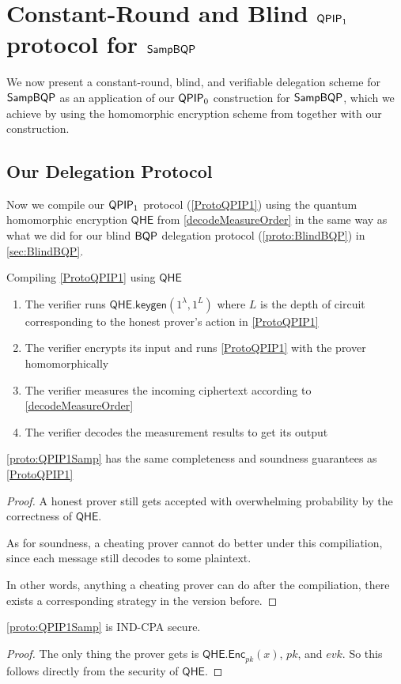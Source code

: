 \section{Constant-Round and Blind $\operatorname{\mathsf{QPIP}}_1$ protocol for $\operatorname{\mathsf{SampBQP}}$}

We now present a constant-round, blind, and verifiable delegation scheme for $\operatorname{\mathsf{SampBQP}}$ as an application of our $\operatorname{\mathsf{QPIP}}_0$ construction for $\operatorname{\mathsf{SampBQP}}$,
which we achieve by using the homomorphic encryption scheme from \cite{mahadev_qfhe} together with our construction.

\subsection{Our Delegation Protocol}

Now we compile our $\operatorname{\mathsf{QPIP}}_1$ protocol (\cref{ProtoQPIP1}) using the quantum homomorphic encryption $\mathsf{QHE}$ from \cref{decodeMeasureOrder} in the same way as what we did for our blind $\operatorname{\mathsf{BQP}}$ delegation protocol (\cref{proto:BlindBQP}) in \cref{sec:BlindBQP}.

\begin{protocol}{Compiling \cref{ProtoQPIP1} using $\mathsf{QHE}$}
	\label{proto:QPIP1Samp}
	\begin{enumerate}
		\item The verifier runs $\mathsf{QHE.keygen}(1^\lambda, 1^L)$ where $L$ is the depth of circuit corresponding to the honest prover's action in \cref{ProtoQPIP1}
		\item The verifier encrypts its input and runs \cref{ProtoQPIP1} with the prover homomorphically
		\item The verifier measures the incoming ciphertext according to \cref{decodeMeasureOrder}
		\item The verifier decodes the measurement results to get its output
	\end{enumerate}
\end{protocol}

\begin{thm}
	\cref{proto:QPIP1Samp} has the same completeness and soundness guarantees as \cref{ProtoQPIP1}
\end{thm}
\begin{proof}
	A honest prover still gets accepted with overwhelming probability by the correctness of $\mathsf{QHE}$. 

	As for soundness, a cheating prover cannot do better under this compiliation, since each message still decodes to some plaintext.

	In other words, anything a cheating prover can do after the compiliation, there exists a corresponding strategy in the version before.
\end{proof}

\begin{thm}
	\cref{proto:QPIP1Samp} is IND-CPA secure.
\end{thm}
\begin{proof}
	The only thing the prover gets is $\mathsf{QHE.Enc}_{pk}(x)$, $pk$, and $evk$. So this follows directly from the security of $\mathsf{QHE}$.
\end{proof}
